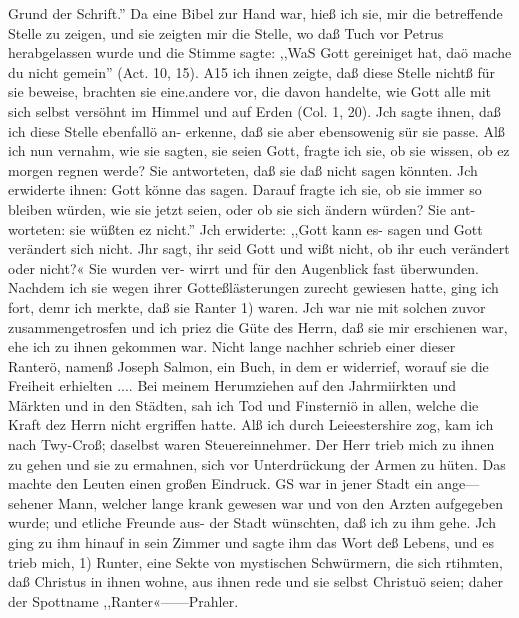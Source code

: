 Grund der Schrift.'' Da eine Bibel zur Hand war, hieß ich sie,
mir die betreffende Stelle zu zeigen, und sie zeigten mir die Stelle,
wo daß Tuch vor Petrus herabgelassen wurde und die Stimme
sagte: ,,WaS Gott gereiniget hat, daö mache du nicht gemein''
(Act. 10, 15). A15 ich ihnen zeigte, daß diese Stelle nichtß für
sie beweise, brachten sie eine.andere vor, die davon handelte, wie
Gott alle mit sich selbst versöhnt im Himmel und auf Erden
(Col. 1, 20). Jch sagte ihnen, daß ich diese Stelle ebenfallö an-
erkenne, daß sie aber ebensowenig sür sie passe. Alß ich nun
vernahm, wie sie sagten, sie seien Gott, fragte ich sie, ob sie
wissen, ob ez morgen regnen werde? Sie antworteten, daß sie
daß nicht sagen könnten. Jch erwiderte ihnen: Gott könne das
sagen. Darauf fragte ich sie, ob sie immer so bleiben würden,
wie sie jetzt seien, oder ob sie sich ändern würden? Sie ant-
worteten: sie wüßten ez nicht.'' Jch erwiderte: ,,Gott kann es-
sagen und Gott verändert sich nicht. Jhr sagt, ihr seid Gott und
wißt nicht, ob ihr euch verändert oder nicht?« Sie wurden ver-
wirrt und für den Augenblick fast überwunden. Nachdem ich sie
wegen ihrer Gotteßlästerungen zurecht gewiesen hatte, ging ich
fort, demr ich merkte, daß sie Ranter 1) waren. Jch war nie
mit solchen zuvor zusammengetrosfen und ich priez die Güte des
Herrn, daß sie mir erschienen war, ehe ich zu ihnen gekommen
war. Nicht lange nachher schrieb einer dieser Ranterö, namenß
Joseph Salmon, ein Buch, in dem er widerrief, worauf sie die
Freiheit erhielten ....
Bei meinem Herumziehen auf den Jahrmiirkten und Märkten
und in den Städten, sah ich Tod und Finsterniö in allen, welche
die Kraft dez Herrn nicht ergriffen hatte. Alß ich durch Leieestershire
zog, kam ich nach Twy-Croß; daselbst waren Steuereinnehmer.
Der Herr trieb mich zu ihnen zu gehen und sie zu ermahnen,
sich vor Unterdrückung der Armen zu hüten. Das machte den
Leuten einen großen Eindruck. GS war in jener Stadt ein ange—
sehener Mann, welcher lange krank gewesen war und von den
Arzten aufgegeben wurde; und etliche Freunde aus- der Stadt
wünschten, daß ich zu ihm gehe. Jch ging zu ihm hinauf in sein
Zimmer und sagte ihm das Wort deß Lebens, und es trieb mich,
1) Runter, eine Sekte von mystischen Schwürmern, die sich rtihmten,
daß Christus in ihnen wohne, aus ihnen rede und sie selbst Christuö seien;
daher der Spottname ,,Ranter«——Prahler.



